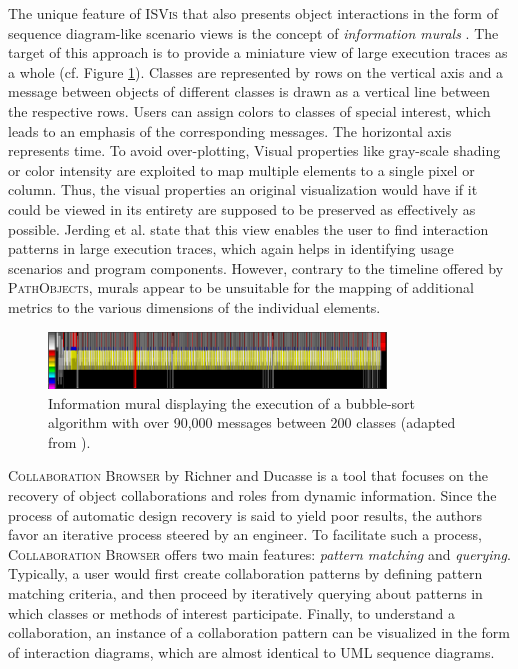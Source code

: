 The unique feature of \textsc{ISVis} \cite{jerding_using_1997} that also presents object interactions in the form of sequence diagram-like scenario views is the concept of \emph{ information murals} \cite{jerding_information_1998, jerding_visualizing_1996}.
The target of this approach is to provide a miniature view of large execution traces as a whole (cf. Figure \ref{fig:NotationMural}).
Classes are represented by rows on the vertical axis and a message between objects of different classes is drawn as a vertical line between the respective rows.
Users can assign colors to classes of special interest, which leads to an emphasis of the corresponding messages.
The horizontal axis represents time.
To avoid over-plotting, Visual properties like gray-scale shading or color intensity are exploited to map multiple elements to a single pixel or column.
Thus, the visual properties an original visualization would have if it could be viewed in its entirety are supposed to be preserved as effectively as possible.
Jerding et al. state that this view enables the user to find interaction patterns in large execution traces, which again helps in identifying usage scenarios and program components.
However, contrary to the timeline offered by \textsc{PathObjects}, murals appear to be unsuitable for the mapping of additional metrics to the various dimensions of the individual elements.

\begin{figure}[tb]
	\centering
	\includegraphics[width=0.8\textwidth]{../images/06-Mural}
	\caption[Information Mural by Jerding et al.]{Information mural displaying the execution of a bubble-sort algorithm with over 90,000 messages between 200 classes (adapted from \cite{jerding_information_1998}).}
	\label{fig:NotationMural}
\end{figure}

\textsc{Collaboration Browser} by Richner and Ducasse \cite{richner_using_2002} is a tool that focuses on the recovery of object collaborations and roles from dynamic information.
Since the process of automatic design recovery is said to yield poor results, the authors favor an iterative process steered by an engineer.
To facilitate such a process, \textsc{Collaboration Browser} offers two main features: \emph{pattern matching} and \emph{querying}. 
Typically, a user would first create collaboration patterns by defining pattern matching criteria, and then proceed by iteratively querying about patterns in which classes or methods of interest participate.
Finally, to understand a collaboration, an instance of a collaboration pattern can be visualized in the form of interaction diagrams, which are almost identical to UML sequence diagrams. 

